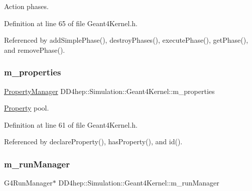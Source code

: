 Action phases. 



Definition at line 65 of file Geant4\+Kernel.\+h.



Referenced by add\+Simple\+Phase(), destroy\+Phases(), execute\+Phase(), get\+Phase(), and remove\+Phase().

\hypertarget{class_d_d4hep_1_1_simulation_1_1_geant4_kernel_ac69e53b910f7ce956e684c4e2ccedc9f}{}\label{class_d_d4hep_1_1_simulation_1_1_geant4_kernel_ac69e53b910f7ce956e684c4e2ccedc9f} 
\subsubsection{\texorpdfstring{m\+\_\+properties}{m\_properties}}
{\footnotesize\ttfamily \hyperlink{class_d_d4hep_1_1_property_manager}{Property\+Manager} D\+D4hep\+::\+Simulation\+::\+Geant4\+Kernel\+::m\+\_\+properties\hspace{0.3cm}{\ttfamily [protected]}}



\hyperlink{class_d_d4hep_1_1_property}{Property} pool. 



Definition at line 61 of file Geant4\+Kernel.\+h.



Referenced by declare\+Property(), has\+Property(), and id().

\hypertarget{class_d_d4hep_1_1_simulation_1_1_geant4_kernel_a3680634351832865b7df33095adf8ef7}{}\label{class_d_d4hep_1_1_simulation_1_1_geant4_kernel_a3680634351832865b7df33095adf8ef7} 
\subsubsection{\texorpdfstring{m\+\_\+run\+Manager}{m\_runManager}}
{\footnotesize\ttfamily G4\+Run\+Manager$\ast$ D\+D4hep\+::\+Simulation\+::\+Geant4\+Kernel\+::m\+\_\+run\+Manager\hspace{0.3cm}{\ttfamily [protected]}}



